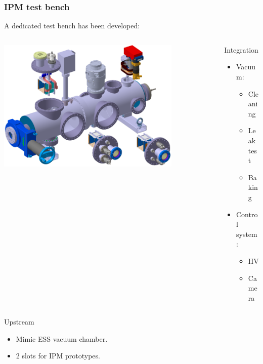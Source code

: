 \begin{frame}[t]
  \frametitle{IPM test bench}
  A dedicated test bench has been developed:
  \begin{columns}[T]
    \begin{column}{0.60\textwidth}
      \begin{center}
        \includegraphics[width=0.8\textwidth]{04_Test/fig/fig000_Testbench2.png}
      \end{center}
    \end{column}

    \begin{column}{0.30\textwidth}
      \begin{block}{Integration}
        \begin{itemize}
          \item Vacuum:
                \begin{itemize}
                  \item Cleaning
                  \item Leak test
                  \item Baking
                \end{itemize}
          \item Control system:
                \begin{itemize}
                  \item HV
                  \item Camera
                \end{itemize}
        \end{itemize}
      \end{block}
    \end{column}
  \end{columns}
  \begin{columns}[T]
    \begin{column}{0.45\textwidth}
      \begin{block}{Upstream}
        \begin{itemize}
          \item Mimic ESS vacuum chamber.
          \item 2 slots for IPM prototypes.
        \end{itemize}
      \end{block}
    \end{column}


\end{columns}
\end{frame}
